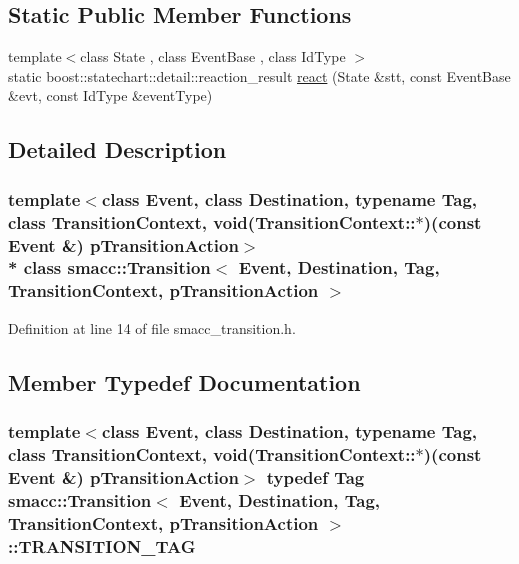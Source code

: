 \subsection*{Static Public Member Functions}
\begin{DoxyCompactItemize}
\item 
{\footnotesize template$<$class State , class Event\+Base , class Id\+Type $>$ }\\static boost\+::statechart\+::detail\+::reaction\+\_\+result \hyperlink{classsmacc_1_1Transition_a8399e8d49fa6f3ac72b06df0b2010932}{react} (State \&stt, const Event\+Base \&evt, const Id\+Type \&event\+Type)
\end{DoxyCompactItemize}


\subsection{Detailed Description}
\subsubsection*{template$<$class Event, class Destination, typename Tag, class Transition\+Context, void(\+Transition\+Context\+::$\ast$)(const Event \&) p\+Transition\+Action$>$\\*
class smacc\+::\+Transition$<$ Event, Destination, Tag, Transition\+Context, p\+Transition\+Action $>$}



Definition at line 14 of file smacc\+\_\+transition.\+h.



\subsection{Member Typedef Documentation}
\subsubsection[{\texorpdfstring{T\+R\+A\+N\+S\+I\+T\+I\+O\+N\+\_\+\+T\+AG}{TRANSITION_TAG}}]{\setlength{\rightskip}{0pt plus 5cm}template$<$class Event, class Destination, typename Tag, class Transition\+Context, void(\+Transition\+Context\+::$\ast$)(const Event \&) p\+Transition\+Action$>$ typedef Tag {\bf smacc\+::\+Transition}$<$ Event, Destination, Tag, Transition\+Context, p\+Transition\+Action $>$\+::{\bf T\+R\+A\+N\+S\+I\+T\+I\+O\+N\+\_\+\+T\+AG}}\hypertarget{classsmacc_1_1Transition_a672e883135344c4aea140381dd4d1c1d}{}\label{classsmacc_1_1Transition_a672e883135344c4aea140381dd4d1c1d}


